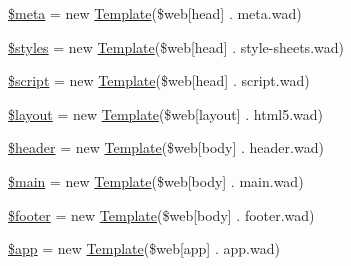 \begin{DoxyCompactItemize}
\item 
\hyperlink{namespace_w_a_f_f_l_e_1_1_controller_a9e6fc1ae0498be7d1e682f8bcc9299df}{\$meta} = new \hyperlink{class_w_a_f_f_l_e_1_1_framework_1_1_engines_1_1_template}{Template}(\$web\mbox{[}\textquotesingle{}head\textquotesingle{}\mbox{]} . \textquotesingle{}meta.\+wad\textquotesingle{})
\item 
\hyperlink{namespace_w_a_f_f_l_e_1_1_controller_a920c320068535c09e154c6707eb42ded}{\$styles} = new \hyperlink{class_w_a_f_f_l_e_1_1_framework_1_1_engines_1_1_template}{Template}(\$web\mbox{[}\textquotesingle{}head\textquotesingle{}\mbox{]} . \textquotesingle{}style-\/sheets.\+wad\textquotesingle{})
\item 
\hyperlink{namespace_w_a_f_f_l_e_1_1_controller_af1de23de512bb5bf634c157dbb1b7758}{\$script} = new \hyperlink{class_w_a_f_f_l_e_1_1_framework_1_1_engines_1_1_template}{Template}(\$web\mbox{[}\textquotesingle{}head\textquotesingle{}\mbox{]} . \textquotesingle{}script.\+wad\textquotesingle{})
\item 
\hyperlink{namespace_w_a_f_f_l_e_1_1_controller_a2b0d08e73a90b9443ce37506b7c6a544}{\$layout} = new \hyperlink{class_w_a_f_f_l_e_1_1_framework_1_1_engines_1_1_template}{Template}(\$web\mbox{[}\textquotesingle{}layout\textquotesingle{}\mbox{]} . \textquotesingle{}html5.\+wad\textquotesingle{})
\item 
\hyperlink{namespace_w_a_f_f_l_e_1_1_controller_a4f44601f2b9dc8a1644bce53c94ce622}{\$header} = new \hyperlink{class_w_a_f_f_l_e_1_1_framework_1_1_engines_1_1_template}{Template}(\$web\mbox{[}\textquotesingle{}body\textquotesingle{}\mbox{]} . \textquotesingle{}header.\+wad\textquotesingle{})
\item 
\hyperlink{namespace_w_a_f_f_l_e_1_1_controller_a67a14860123d3f27f92196239b0a5b46}{\$main} = new \hyperlink{class_w_a_f_f_l_e_1_1_framework_1_1_engines_1_1_template}{Template}(\$web\mbox{[}\textquotesingle{}body\textquotesingle{}\mbox{]} . \textquotesingle{}main.\+wad\textquotesingle{})
\item 
\hyperlink{namespace_w_a_f_f_l_e_1_1_controller_abaa4216c852c51c380dd8f10d3cfe944}{\$footer} = new \hyperlink{class_w_a_f_f_l_e_1_1_framework_1_1_engines_1_1_template}{Template}(\$web\mbox{[}\textquotesingle{}body\textquotesingle{}\mbox{]} . \textquotesingle{}footer.\+wad\textquotesingle{})
\item 
\hyperlink{namespace_w_a_f_f_l_e_1_1_controller_adfb117f244076aa9bc269269f7e57403}{\$app} = new \hyperlink{class_w_a_f_f_l_e_1_1_framework_1_1_engines_1_1_template}{Template}(\$web\mbox{[}\textquotesingle{}app\textquotesingle{}\mbox{]} . \textquotesingle{}app.\+wad\textquotesingle{})
\end{DoxyCompactItemize}



